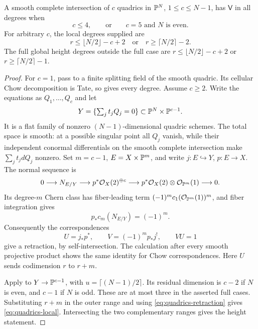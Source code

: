 \begin{theorem}\label{thm:quadrics}
A smooth complete intersection of $c$ quadrics in $\mathbb P^N$,
$1\leq c\leq N-1$, has $\mathsf V$ in all degrees when
\[
 c\leq4,\qquad\text{or}\qquad c=5\text{ and }N\text{ is even}.
\]
For arbitrary $c$, the local degrees supplied are
\begin{equation}\label{eq:quadrics-local}
 r\leq\lfloor N/2\rfloor-c+2
 \quad\text{or}\quad r\geq\lceil N/2\rceil-2.
\end{equation}
The full global height degrees outside the full case are
$r\leq\lfloor N/2\rfloor-c+2$ or
$r\geq\lceil N/2\rceil-1$.
\end{theorem}

\begin{proof}
For $c=1$, pass to a finite splitting field of the smooth quadric.
Its cellular Chow decomposition is Tate, so 
gives every degree. Assume $c\geq2$. Write the equations as
$Q_1,\ldots,Q_c$ and let
\[
 Y=\{\textstyle\sum_jt_jQ_j=0\}\subset\mathbb P^N\times\mathbb P^{c-1}.
\]
It is a flat family of nonzero $(N-1)$-dimensional quadric
schemes. The total space is smooth: at a possible singular point
all $Q_j$ vanish, while their independent conormal differentials
on the smooth complete intersection make $\sum_jt_jdQ_j$
nonzero. Set $m=c-1$, $E=X\times\mathbb P^m$, and write
$j:E\hookrightarrow Y$, $p:E\to X$. The normal sequence is
\[
 0\longrightarrow N_{E/Y}\longrightarrow
 p^*\mathcal O_X(2)^{\oplus c}\longrightarrow
 p^*\mathcal O_X(2)\otimes\mathcal O_{\mathbb P^m}(1)
 \longrightarrow0.
\]
Its degree-$m$ Chern class has fiber-leading term
$(-1)^mc_1(\mathcal O_{\mathbb P^m}(1))^m$, and fiber integration gives
\[
 p_*c_m(N_{E/Y})=(-1)^m.
\]
Consequently the correspondences
\begin{equation}\label{eq:quadrics-retraction}
 U=j_*p^*,\qquad V=(-1)^mp_*j^!,\qquad VU=1
\end{equation}
give a retraction, by self-intersection. The calculation after
every smooth projective product shows the same identity for
Chow correspondences. Here $U$ sends codimension $r$ to $r+m$.

Apply  to $Y\to\mathbb P^{c-1}$, with
$u=\lceil(N-1)/2\rceil$. Its residual dimension is $c-2$ if
$N$ is even, and $c-1$ if $N$ is odd. These are at most three
in the asserted full cases. Substituting $r+m$ in the outer
range and using \eqref{eq:quadrics-retraction} gives
\eqref{eq:quadrics-local}. Intersecting the two complementary
ranges gives the height statement.
\end{proof}

